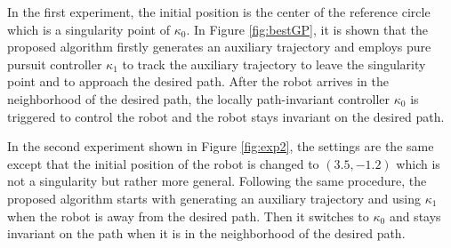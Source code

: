{In the first experiment, the initial position is the center of the reference circle which is a singularity point of $\kappa_0$. In Figure \ref{fig:bestGP}, it is shown that the proposed algorithm firstly generates an auxiliary trajectory and employs pure pursuit controller $\kappa_{1}$ to track the auxiliary trajectory to leave the singularity point and to approach the desired path. After the robot arrives in the neighborhood of the desired path, the locally path-invariant controller $\kappa_{0}$ is triggered to control the robot and the robot stays invariant on the desired path. 



 In the second experiment shown in Figure \ref{fig:exp2}, the settings are the same except that the initial position of the robot is changed to $(3.5, -1.2)$ which is not a singularity but rather more general. Following the same procedure, the proposed algorithm starts with generating an auxiliary trajectory and using $\kappa_{1}$ when the robot is away from the desired path. Then it switches to $\kappa_{0}$ and stays invariant on the path when it is in the neighborhood of the desired path.}
 
